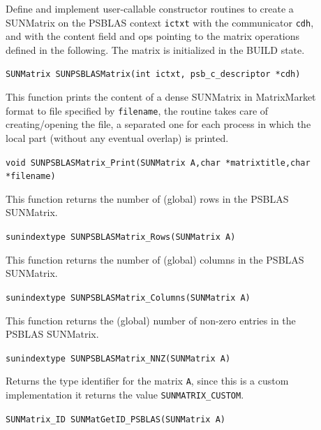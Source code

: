 \documentclass[twoside,a4paper]{refart}
\theoremstyle{definition}
\begin{document}
\begin{description}
\item[] Define and implement user-callable constructor routines to create a
SUNMatrix on the PSBLAS context \lstinline[style=CStyle]|ictxt| with the communicator \lstinline[style=CStyle]|cdh|, and with the content field and ops pointing to the matrix operations defined in the following. The matrix is initialized in the BUILD state.

 \lstinline[style=CStyle]|SUNMatrix SUNPSBLASMatrix(int ictxt, psb_c_descriptor *cdh)|

\item[] This function prints the content of a dense SUNMatrix in MatrixMarket format to file specified by \texttt{filename}, the routine takes care of creating/opening the file, a separated one for each process in which the local part (without any eventual overlap) is printed.

 \lstinline[style=CStyle]|void SUNPSBLASMatrix_Print(SUNMatrix A,char *matrixtitle,char *filename)|

\item[] This function returns the number of (global) rows in the PSBLAS SUNMatrix.

 \lstinline[style=CStyle]|sunindextype SUNPSBLASMatrix_Rows(SUNMatrix A)|

\item[] This function returns the number of (global) columns in the PSBLAS SUNMatrix.

 \lstinline[style=CStyle]|sunindextype SUNPSBLASMatrix_Columns(SUNMatrix A)|

\item[] This function returns the (global) number of non-zero entries in the PSBLAS SUNMatrix.

 \lstinline[style=CStyle]|sunindextype SUNPSBLASMatrix_NNZ(SUNMatrix A)|

\item[] Returns the type identifier for the matrix \texttt{A}, since this is a custom implementation it returns the value \texttt{SUNMATRIX\_CUSTOM}.

 \lstinline[style=CStyle]|SUNMatrix_ID SUNMatGetID_PSBLAS(SUNMatrix A)|


\end{description}
\end{document}
